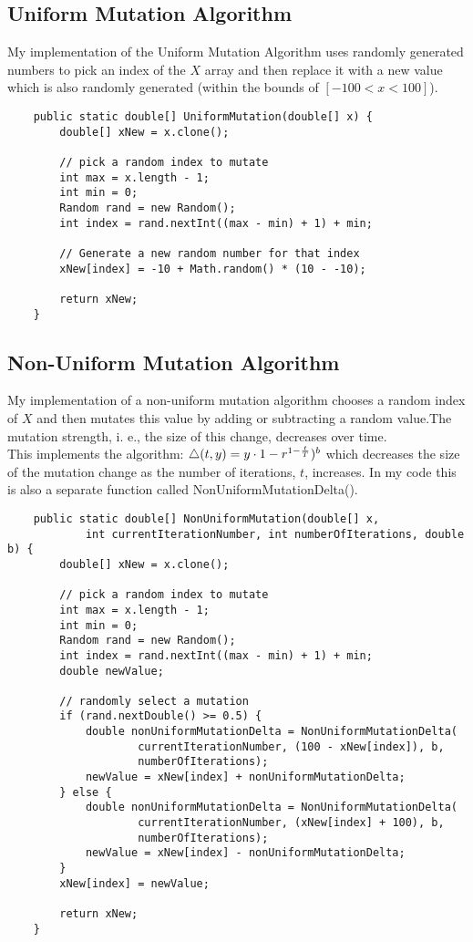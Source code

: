 \documentclass{article}
\begin{document}
	\subsection{Uniform Mutation Algorithm}
	My implementation of the Uniform Mutation Algorithm uses randomly generated numbers to pick an index of the $X$ array and then replace it with a new value which is also randomly generated (within the bounds of $[-100 < x < 100]$).
	\begin{lstlisting}
	public static double[] UniformMutation(double[] x) {
		double[] xNew = x.clone();

		// pick a random index to mutate
		int max = x.length - 1;
		int min = 0;
		Random rand = new Random();
		int index = rand.nextInt((max - min) + 1) + min;

		// Generate a new random number for that index
		xNew[index] = -10 + Math.random() * (10 - -10);

		return xNew;
	}
	\end{lstlisting}
    
   	\subsection{Non-Uniform Mutation Algorithm}
	My implementation of a non-uniform mutation algorithm chooses a random index of $X$ and then mutates this value by adding or subtracting a random value.The mutation strength, i. e., the size of this change, decreases over time.\\
	
	This implements the algorithm:
	$\bigtriangleup(t,y) = y \cdot {1 - r^{ 1 - {t \over T} }})^b$
	which decreases the size of the mutation change as the number of iterations, $t$, increases. In my code this is also a separate function called NonUniformMutationDelta().
	
	\begin{lstlisting}
	public static double[] NonUniformMutation(double[] x,
			int currentIterationNumber, int numberOfIterations, double b) {
		double[] xNew = x.clone();

		// pick a random index to mutate
		int max = x.length - 1;
		int min = 0;
		Random rand = new Random();
		int index = rand.nextInt((max - min) + 1) + min;
		double newValue;

		// randomly select a mutation
		if (rand.nextDouble() >= 0.5) {
			double nonUniformMutationDelta = NonUniformMutationDelta(
					currentIterationNumber, (100 - xNew[index]), b,
					numberOfIterations);
			newValue = xNew[index] + nonUniformMutationDelta;
		} else {
			double nonUniformMutationDelta = NonUniformMutationDelta(
					currentIterationNumber, (xNew[index] + 100), b,
					numberOfIterations);
			newValue = xNew[index] - nonUniformMutationDelta;
		}
		xNew[index] = newValue;

		return xNew;
	}
	\end{lstlisting}
   	
\end{document}
